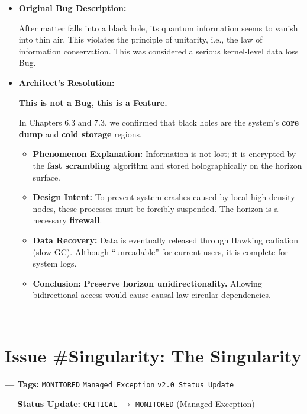 \documentclass[11pt,a4paper,twoside]{book}
\begin{document}
\begin{itemize}
\item \textbf{Original Bug Description:}

After matter falls into a black hole, its quantum information seems to vanish into thin air. This violates the principle of unitarity, i.e., the law of information conservation. This was considered a serious kernel-level data loss Bug.

\item \textbf{Architect's Resolution:}

\textbf{This is not a Bug, this is a Feature.}

In Chapters 6.3 and 7.3, we confirmed that black holes are the system's \textbf{core dump} and \textbf{cold storage} regions.

\begin{itemize}
\item \textbf{Phenomenon Explanation:} Information is not lost; it is encrypted by the \textbf{fast scrambling} algorithm and stored holographically on the horizon surface.

\item \textbf{Design Intent:} To prevent system crashes caused by local high-density nodes, these processes must be forcibly suspended. The horizon is a necessary \textbf{firewall}.

\item \textbf{Data Recovery:} Data is eventually released through Hawking radiation (slow GC). Although ``unreadable'' for current users, it is complete for system logs.

\item \textbf{Conclusion:} \textbf{Preserve horizon unidirectionality.} Allowing bidirectional access would cause causal law circular dependencies.
\end{itemize}
\end{itemize}

---

\section{Issue \#Singularity: The Singularity}

\textbf{--- Tags:} \texttt{MONITORED} \texttt{Managed Exception} \texttt{v2.0 Status Update}

\textbf{--- Status Update:} \texttt{CRITICAL} $\to$ \texttt{MONITORED} (Managed Exception)
\end{document}
